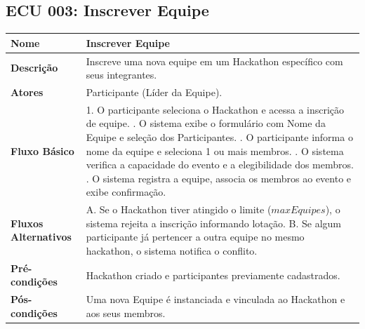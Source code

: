 \documentclass[12pt]{article}
\begin{document}
\subsection{ECU 003: Inscrever Equipe}
\begin{table}[H]
\centering
\small
\begin{tabular}{|p{3.2cm}|p{11.5cm}|}
\hline
\textbf{Nome} & Inscrever Equipe \\ \hline
\textbf{Descrição} & Inscreve uma nova equipe em um Hackathon específico com seus integrantes. \\ \hline
\textbf{Atores} & Participante (Líder da Equipe). \\ \hline
\textbf{Fluxo Básico} & 
1. O participante seleciona o Hackathon e acessa a inscrição de equipe. \newline
2. O sistema exibe o formulário com Nome da Equipe e seleção dos Participantes. \newline
3. O participante informa o nome da equipe e seleciona 1 ou mais membros. \newline
4. O sistema verifica a capacidade do evento e a elegibilidade dos membros. \newline
5. O sistema registra a equipe, associa os membros ao evento e exibe confirmação. \\ \hline
\textbf{Fluxos Alternativos} & 
A. Se o Hackathon tiver atingido o limite ($maxEquipes$), o sistema rejeita a inscrição informando lotação. \newline
B. Se algum participante já pertencer a outra equipe no mesmo hackathon, o sistema notifica o conflito. \\ \hline
\textbf{Pré-condições} & Hackathon criado e participantes previamente cadastrados. \\ \hline
\textbf{Pós-condições} & Uma nova Equipe é instanciada e vinculada ao Hackathon e aos seus membros. \\ \hline
\end{tabular}
\end{table}
\end{document}
